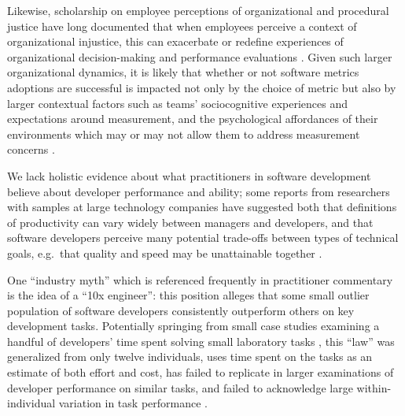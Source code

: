 \documentclass[manuscript,screen,review]{acmart}
\begin{document}
Likewise, scholarship on employee perceptions of organizational and
procedural justice have long documented that when employees perceive a
context of organizational injustice, this can exacerbate or redefine
experiences of organizational decision-making and performance
evaluations
\citep{brocknerInteractiveEffectsProcedural1994, brocknerProceduralFairnessOutcome2007}.
Given such larger organizational dynamics, it is likely that whether or
not software metrics adoptions are successful is impacted not only by
the choice of metric but also by larger contextual factors such as
teams' sociocognitive experiences and expectations around measurement,
and the psychological affordances of their environments which may or may
not allow them to address measurement concerns
\citep{hicksPsychologicalAffordancesCan2024}.

We lack holistic evidence about what practitioners in software
development believe about developer performance and ability; some
reports from researchers with samples at large technology companies have
suggested both that definitions of productivity can vary widely between
managers and developers, and that software developers perceive many
potential trade-offs between types of technical goals, e.g.~that quality
and speed may be unattainable together
\citep{storeyHowDevelopersManagers2022}.

One ``industry myth'' which is referenced frequently in practitioner
commentary is the idea of a ``10x engineer'': this position alleges that
some small outlier population of software developers consistently
outperform others on key development tasks. Potentially springing from
small case studies examining a handful of developers' time spent solving
small laboratory tasks
\citetext{\citealp{sackmanExploratoryExperimentalStudies1968}; \citealp[discussed
in][]{nicholsEndMythIndividual2019}}, this ``law'' was generalized from
only twelve individuals, uses time spent on the tasks as an estimate of
both effort and cost, has failed to replicate in larger examinations of
developer performance on similar tasks, and failed to acknowledge large
within-individual variation in task performance
\citep{nicholsEndMythIndividual2019, shrikanthAssessingPractitionerBeliefs2021}.
\end{document}
